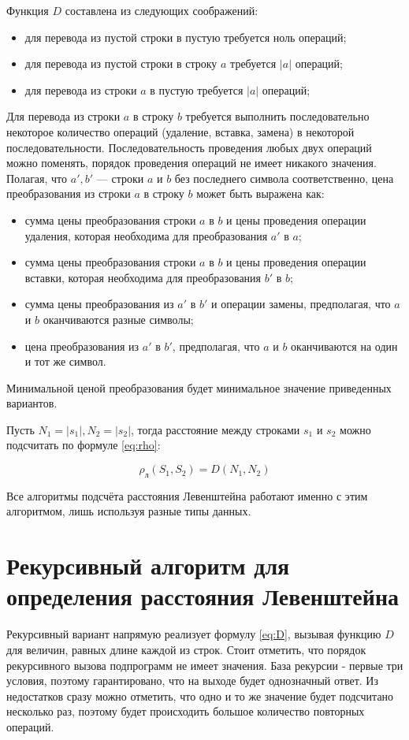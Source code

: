 Функция $D$ составлена из следующих соображений:
\begin{itemize}
	\item для перевода из пустой строки в пустую требуется ноль операций;
	\item для перевода из пустой строки в строку $a$ требуется $|a|$ операций;
	\item для перевода из строки $a$ в пустую требуется $|a|$ операций;
\end{itemize}

Для перевода из строки $a$ в строку $b$ требуется выполнить последовательно некоторое количество операций (удаление, вставка, замена) в некоторой последовательности. Последовательность проведения любых двух операций можно поменять, порядок проведения операций не имеет никакого значения. Полагая, что $a', b'$  — строки $a$ и $b$ без последнего символа соответственно, цена преобразования из строки $a$ в строку $b$ может быть выражена как:
	\begin{itemize}
		\item сумма цены преобразования строки $a$ в $b$ и цены проведения операции удаления, которая необходима для преобразования $a'$ в $a$;
		\item сумма цены преобразования строки $a$ в $b$  и цены проведения операции вставки, которая необходима для преобразования $b'$ в $b$;
		\item сумма цены преобразования из $a'$ в $b'$ и операции замены, предполагая, что $a$ и $b$ оканчиваются разные символы;
		\item цена преобразования из $a'$ в $b'$, предполагая, что $a$ и $b$ оканчиваются на один и тот же символ.
	\end{itemize}

Минимальной ценой преобразования будет минимальное значение приведенных вариантов.

Пусть \begin{math} N_1 = |s_1|, N_2 = |s_2| \end{math}, тогда расстояние между строками $s_{1}$ и $s_{2}$ можно подсчитать по формуле \ref{eq:rho}:

\begin{equation}
	\label{eq:rho}
	\rho_л(S_1, S_2) = D(N_1, N_2)
\end{equation}

Все алгоритмы подсчёта расстояния Левенштейна работают именно с этим алгоритмом, лишь используя разные типы данных.

\section{Рекурсивный алгоритм для определения расстояния Левенштейна}
Рекурсивный вариант напрямую реализует формулу \ref{eq:D}, вызывая функцию $D$ для величин, равных длине каждой из строк. 
Стоит отметить, что порядок рекурсивного вызова подпрограмм не имеет значения. 
База рекурсии - первые три условия, поэтому гарантировано, что на выходе будет однозначный ответ.
Из недостатков сразу можно отметить, что одно и то же значение будет подсчитано несколько раз, поэтому будет происходить большое количество повторных операций.

